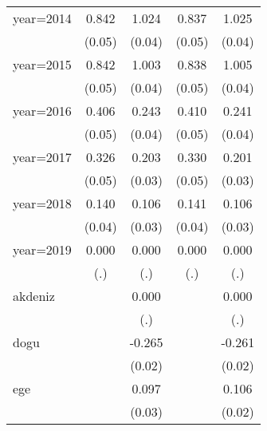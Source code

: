 {\begin{tabular}{l*{4}{c}}
year=2014           &       0.842\sym{***}&       1.024\sym{***}&       0.837\sym{***}&       1.025\sym{***}\\
                    &      (0.05)         &      (0.04)         &      (0.05)         &      (0.04)         \\
year=2015           &       0.842\sym{***}&       1.003\sym{***}&       0.838\sym{***}&       1.005\sym{***}\\
                    &      (0.05)         &      (0.04)         &      (0.05)         &      (0.04)         \\
year=2016           &       0.406\sym{***}&       0.243\sym{***}&       0.410\sym{***}&       0.241\sym{***}\\
                    &      (0.05)         &      (0.04)         &      (0.05)         &      (0.04)         \\
year=2017           &       0.326\sym{***}&       0.203\sym{***}&       0.330\sym{***}&       0.201\sym{***}\\
                    &      (0.05)         &      (0.03)         &      (0.05)         &      (0.03)         \\
year=2018           &       0.140\sym{**} &       0.106\sym{**} &       0.141\sym{**} &       0.106\sym{**} \\
                    &      (0.04)         &      (0.03)         &      (0.04)         &      (0.03)         \\
year=2019           &       0.000         &       0.000         &       0.000         &       0.000         \\
                    &         (.)         &         (.)         &         (.)         &         (.)         \\
akdeniz             &                     &       0.000         &                     &       0.000         \\
                    &                     &         (.)         &                     &         (.)         \\
dogu                &                     &      -0.265\sym{***}&                     &      -0.261\sym{***}\\
                    &                     &      (0.02)         &                     &      (0.02)         \\
ege                 &                     &       0.097\sym{***}&                     &       0.106\sym{***}\\
                    &                     &      (0.03)         &                     &      (0.02)         \\

\end{tabular}}
